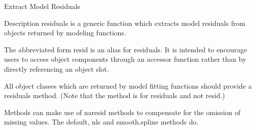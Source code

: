 Extract Model Residuals


Description
residuals is a generic function which extracts model residuals from objects returned by modeling functions. 

The abbreviated form resid is an alias for residuals. It is intended to encourage users to access object components through an accessor function rather than by directly referencing an object slot. 

All object classes which are returned by model fitting functions should provide a residuals method. (Note that the method is for residuals and not resid.) 

Methods can make use of naresid methods to compensate for the omission of missing values. The default, nls and smooth.spline methods do. 


\begin{framed}
\begin{verbatim}

\end{verbatim}
\end{framed}



